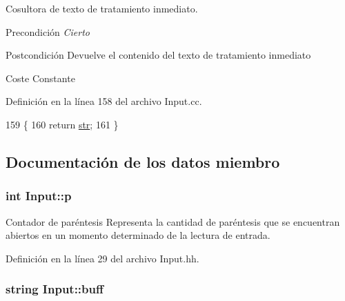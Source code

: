 Cosultora de texto de tratamiento inmediato. 

\begin{DoxyPrecond}{Precondición}
{\itshape Cierto} 
\end{DoxyPrecond}
\begin{DoxyPostcond}{Postcondición}
Devuelve el contenido del texto de tratamiento inmediato 
\end{DoxyPostcond}
\begin{DoxyParagraph}{Coste}
Constante 
\end{DoxyParagraph}


Definición en la línea 158 del archivo Input.\+cc.


\begin{DoxyCode}
159 \{
160   \textcolor{keywordflow}{return} \hyperlink{class_input_a0c2550eda9a6250028748d8870f4e83f}{str};
161 \}
\end{DoxyCode}


\subsection{Documentación de los datos miembro}
\subsubsection[{\texorpdfstring{p}{p}}]{\setlength{\rightskip}{0pt plus 5cm}int Input\+::p\hspace{0.3cm}{\ttfamily [private]}}\hypertarget{class_input_abd6df3e98127cbfeccea2d15b8d1114b}{}\label{class_input_abd6df3e98127cbfeccea2d15b8d1114b}


Contador de paréntesis Representa la cantidad de paréntesis que se encuentran abiertos en un momento determinado de la lectura de entrada. 



Definición en la línea 29 del archivo Input.\+hh.

\subsubsection[{\texorpdfstring{buff}{buff}}]{\setlength{\rightskip}{0pt plus 5cm}string Input\+::buff\hspace{0.3cm}{\ttfamily [private]}}\hypertarget{class_input_a680019c05e47ad35677d5cb692978d98}{}\label{class_input_a680019c05e47ad35677d5cb692978d98}


